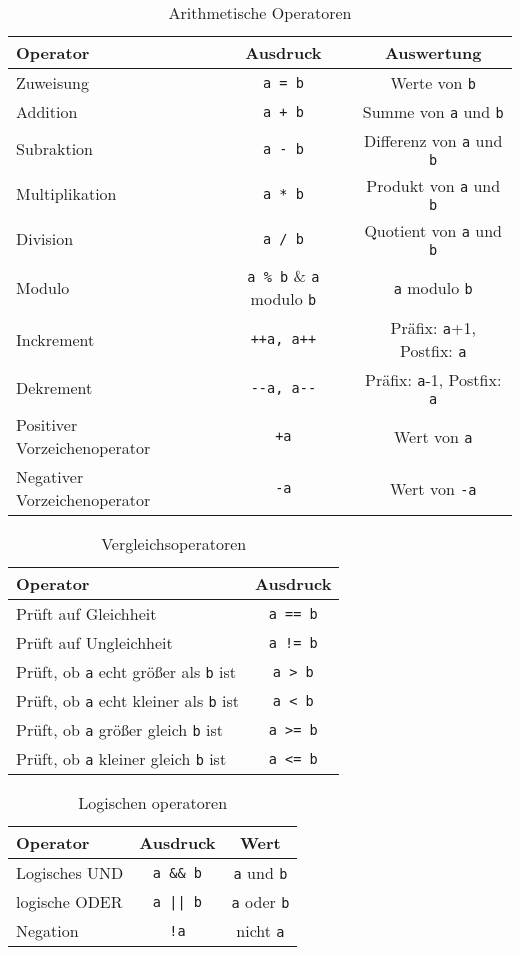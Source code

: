 \begin{table}
  \centering
  \begin{tabular}{l c c}
    \hline
    Operator & Ausdruck & Auswertung \\
    \hline
    Zuweisung & \verb|a = b| & Werte von \verb|b| \\
    Addition & \verb|a + b| & Summe von \verb|a| und \verb|b| \\
    Subraktion & \verb|a - b| & Differenz von \verb|a| und \verb|b| \\
    Multiplikation & \verb|a * b| & Produkt von \verb|a| und \verb|b| \\
    Division & \verb|a / b| & Quotient von \verb|a| und \verb|b| \\
    Modulo & \verb|a % b| & \verb|a| modulo \verb|b| \\
    Inckrement & \verb|++a, a++| & Präfix: \verb|a|+1, Postfix: \verb|a| \\
    Dekrement & \verb|--a, a--| & Präfix: \verb|a|-1, Postfix: \verb|a| \\
    Positiver Vorzeichenoperator & \verb|+a| & Wert von \verb|a| \\
    Negativer Vorzeichenoperator & \verb|-a| & Wert von \verb|-a|  \\
    \hline
  \end{tabular}
  \caption{Arithmetische Operatoren \label{oper}}
\end{table}

\begin{table}
  \centering
  \begin{tabular}{l c}
    \hline
    Operator & Ausdruck \\
    \hline
    Prüft auf Gleichheit & \verb|a == b|  \\
    Prüft auf Ungleichheit & \verb|a != b| \\
    Prüft, ob \verb|a| echt größer als \verb|b| ist & \verb|a > b| \\
    Prüft, ob \verb|a| echt kleiner als \verb|b| ist & \verb|a < b| \\
    Prüft, ob \verb|a| größer gleich \verb|b| ist & \verb|a >= b| \\
    Prüft, ob \verb|a| kleiner gleich \verb|b| ist & \verb|a <= b| \\
    \hline
  \end{tabular}
  \caption{Vergleichsoperatoren \label{vergoper}}
\end{table}

\begin{table}
  \centering
  \begin{tabular}{l c c}
    \hline
    Operator & Ausdruck & Wert \\
    \hline
    Logisches UND & \verb|a && b|  &   \verb|a| und \verb|b| \\

    logische ODER & \verb'a || b'  &   \verb|a| oder \verb|b| \\

    Negation      & \verb|!a|      &   nicht \verb|a| \\
    \hline
  \end{tabular}
  \caption{Logischen operatoren \label{vergoper2}}
\end{table}
